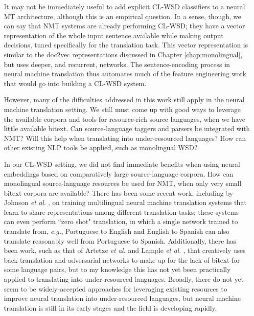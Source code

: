 It may not be immediately useful to add explicit CL-WSD classifiers to a neural
MT architecture, although this is an empirical question. In a sense, though, we
can say that NMT systems are already performing CL-WSD; they have a vector
representation of the whole input sentence available while making output
decisions, tuned specifically for the translation task. This vector
representation is similar to the doc2vec representations discussed in Chapter
\ref{chap:monolingual}, but uses deeper, and recurrent, networks. The
sentence-encoding process in neural machine translation thus automates much of
the feature engineering work that would go into building a CL-WSD system.

However, many of the difficulties addressed in this work still apply in the
neural machine translation setting. We still must come up with good ways to
leverage the available corpora and tools for resource-rich source languages,
when we have little available bitext. Can source-language taggers and parsers
be integrated with NMT? Will this help when translating into under-resourced
languages? How can other existing NLP tools be applied, such as monolingual
WSD?

In our CL-WSD setting, we did not find immediate benefits when using neural
embeddings based on comparatively large source-language corpora. How can
monolingual source-language resources be used for NMT, when only very small
bitext corpora are available?  There has been some recent work, including by
Johnson \emph{et al.} \cite{TACL1081}, on training multilingual neural machine
translation systems that learn to share representations among different
translation tasks; these systems can even perform ``zero shot" translation, in
which a single network trained to translate from, \emph{e.g.}, Portuguese to
English and English to Spanish can also translate reasonably well from
Portuguese to Spanish.
Additionally, there has been work, such as that of Artetxe \emph{et al.}
\cite{artetxe2018unsupervised} and Lample \emph{et al.}
\cite{lample2018unsupervised}, that creatively uses back-translation and
adversarial networks to make up for the lack of bitext for some language pairs,
but to my knowledge this has not yet been practically applied to translating
into under-resourced languages.  Broadly, there do not yet seem to be
widely-accepted approaches for leveraging existing resources to improve neural
translation into under-resourced languages, but neural machine translation is
still in its early stages and the field is developing rapidly.

